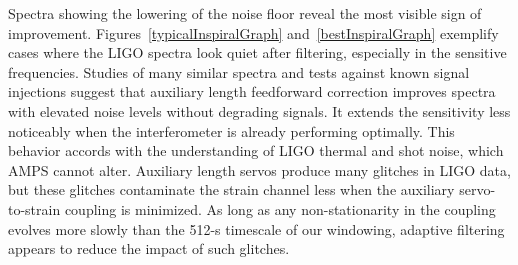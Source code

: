 Spectra showing the lowering of the noise floor reveal the most visible sign of improvement. Figures~\ref{typicalInspiralGraph} and~\ref{bestInspiralGraph} exemplify cases where the LIGO spectra look quiet after filtering, especially in the sensitive frequencies. Studies of many similar spectra and tests against known signal injections suggest that auxiliary length feedforward correction improves spectra with elevated noise levels without degrading signals. It extends the sensitivity less noticeably when the interferometer is already performing optimally. This behavior accords with the understanding of LIGO thermal and shot noise, which AMPS cannot alter. Auxiliary length servos produce many glitches in LIGO data, but these glitches contaminate the strain channel less when the auxiliary servo-to-strain coupling is minimized. As long as any non-stationarity in the coupling evolves more slowly than the 512-s timescale of our windowing, adaptive filtering appears to reduce the impact of such glitches.

